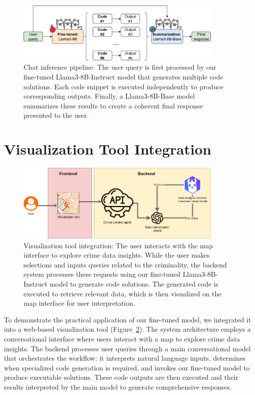 \begin{figure}[H]
  \centering
  \includegraphics[width=0.9\textwidth]{images/inference_pipeline.drawio.png}
  \caption{Chat inference pipeline: The user query is first processed by our fine-tuned Llama3-8B-Instruct model that generates multiple code solutions. Each code snippet is executed independently to produce corresponding outputs. Finally, a Llama3-8B-Base model summarizes these results to create a coherent final response presented to the user.}
  \label{fig:inference_pipeline}
\end{figure}

\section{Visualization Tool Integration}

\begin{figure}[H]
  \centering
  \includegraphics[width=0.9\textwidth]{images/tesis-Visualization tool.png}
  \caption{Visualization tool integration: The user interacts with the map interface to explore crime data insights. While the user makes selections and inputs queries related to the criminality, the backend system processes these requests using our fine-tuned Llama3-8B-Instruct model to generate code solutions. The generated code is executed to retrieve relevant data, which is then visualized on the map interface for user interpretation.}
  \label{fig:visualization_tool_integration}
\end{figure}

To demonstrate the practical application of our fine-tuned model, we integrated it into a web-based visualization tool (Figure~\ref{fig:visualization_tool_integration}). The system architecture employs a conversational interface where users interact with a map to explore crime data insights. The backend processes user queries through a main conversational model that orchestrates the workflow: it interprets natural language inputs, determines when specialized code generation is required, and invokes our fine-tuned model to produce executable solutions. These code outputs are then executed and their results interpreted by the main model to generate comprehensive responses.

